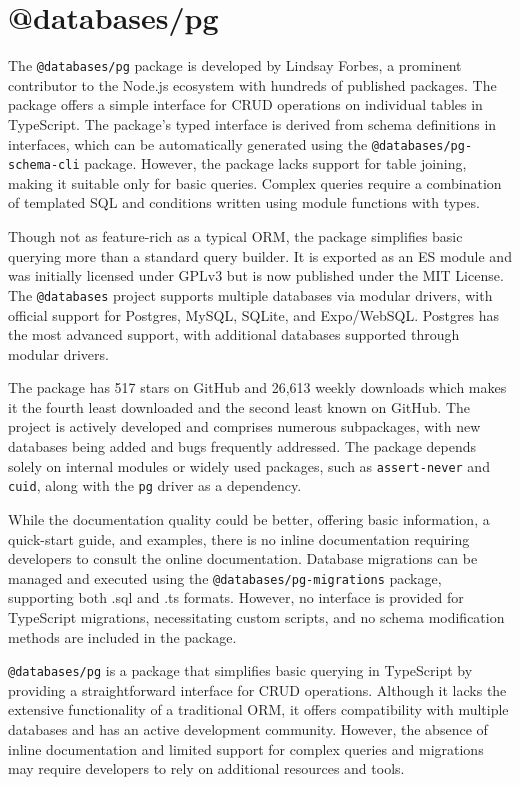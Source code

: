 \section{@databases/pg}
The \texttt{@databases/pg} package is developed by Lindsay Forbes, a prominent
contributor to the Node.js ecosystem with hundreds of published packages. The
package offers a simple interface for CRUD operations on individual tables in
TypeScript. The package's typed interface is derived from schema definitions in
interfaces, which can be automatically generated using the
\texttt{@databases/pg-schema-cli} package. However, the package lacks support
for table joining, making it suitable only for basic queries. Complex queries
require a combination of templated SQL and conditions written using module
functions with types.

Though not as feature-rich as a typical ORM, the package simplifies basic
querying more than a standard query builder. It is exported as an ES module and
was initially licensed under GPLv3 but is now published under the MIT License.
The \texttt{@databases} project supports multiple databases via modular drivers,
with official support for Postgres, MySQL, SQLite, and Expo/WebSQL. Postgres has
the most advanced support, with additional databases supported through modular
drivers.

The package has 517 stars on GitHub and 26,613 weekly downloads which makes it
the fourth least downloaded and the second least known on GitHub. The project is
actively developed and comprises numerous subpackages, with new databases being
added and bugs frequently addressed. The package depends solely on internal
modules or widely used packages, such as \texttt{assert-never} and
\texttt{cuid}, along with the \texttt{pg} driver as a dependency.

While the documentation quality could be better, offering basic information, a
quick-start guide, and examples, there is no inline documentation requiring
developers to consult the online documentation. Database migrations can be
managed and executed using the \texttt{@databases/pg-migrations} package,
supporting both .sql and .ts formats. However, no interface is provided for
TypeScript migrations, necessitating custom scripts, and no schema modification
methods are included in the package.

\texttt{@databases/pg} is a package that simplifies basic querying in TypeScript
by providing a straightforward interface for CRUD operations. Although it lacks
the extensive functionality of a traditional ORM, it offers compatibility with
multiple databases and has an active development community. However, the absence
of inline documentation and limited support for complex queries and migrations
may require developers to rely on additional resources and tools.

